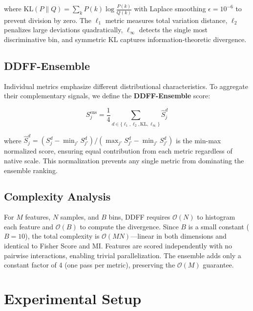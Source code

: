 \documentclass[conference]{IEEEtran}
\begin{document}
\noindent where $\text{KL}(P \| Q) = \sum_k P(k) \log \frac{P(k)}{Q(k)}$ with Laplace smoothing $\epsilon = 10^{-6}$ to prevent division by zero. The $\ell_1$ metric measures total variation distance, $\ell_2$ penalizes large deviations quadratically, $\ell_\infty$ detects the single most discriminative bin, and symmetric KL captures information-theoretic divergence.

\subsection{DDFF-Ensemble}

Individual metrics emphasize different distributional characteristics. To aggregate their complementary signals, we define the \textbf{DDFF-Ensemble} score:

\begin{equation}
    S_j^{\text{ens}} = \frac{1}{4} \sum_{d \in \{\ell_1, \ell_2, \text{KL}, \ell_\infty\}} \hat{S}_j^{d}
    \label{eq:ensemble}
\end{equation}

\noindent where $\hat{S}_j^{d} = (S_j^d - \min_{j'} S_{j'}^d) / (\max_{j'} S_{j'}^d - \min_{j'} S_{j'}^d)$ is the min-max normalized score, ensuring equal contribution from each metric regardless of native scale. This normalization prevents any single metric from dominating the ensemble ranking.

\subsection{Complexity Analysis}

For $M$ features, $N$ samples, and $B$ bins, DDFF requires $\mathcal{O}(N)$ to histogram each feature and $\mathcal{O}(B)$ to compute the divergence. Since $B$ is a small constant ($B=10$), the total complexity is $\mathcal{O}(MN)$---linear in both dimensions and identical to Fisher Score and MI. Features are scored independently with no pairwise interactions, enabling trivial parallelization. The ensemble adds only a constant factor of 4 (one pass per metric), preserving the $\mathcal{O}(M)$ guarantee.

\section{Experimental Setup}
\label{sec:setup}
\end{document}
